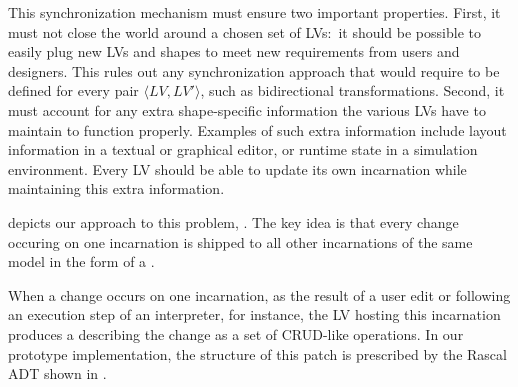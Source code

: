 This synchronization mechanism must ensure two important properties.
First, it must not close the world around a chosen set of LVs:~it should be possible to easily plug new LVs and shapes to meet new requirements from users and designers.
This rules out any synchronization approach that would require to be defined for every pair $\langle LV, LV' \rangle$, such as bidirectional transformations. 
Second, it must account for any extra shape-specific information the various LVs have to maintain to function properly.
Examples of such extra information include layout information in a textual or graphical editor, or runtime state in a simulation environment.
Every LV should be able to update its own incarnation while maintaining this extra information.

 depicts our approach to this problem, \prism.
The key idea is that every change occuring on one incarnation is shipped to all other incarnations of the same model in the form of a \patch.

When a change occurs on one incarnation, as the result of a user edit or following an execution step of an interpreter, for instance, the LV hosting this incarnation produces a \patch describing the change as a set of CRUD-like operations.
In our prototype implementation, the structure of this patch is prescribed by the Rascal ADT shown in .
